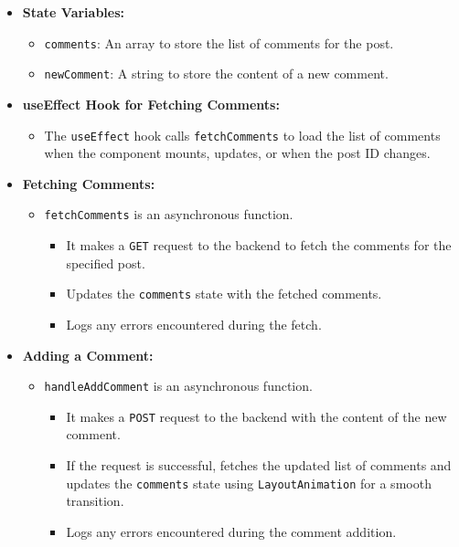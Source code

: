 \begin{itemize}
    \item \textbf{State Variables:}
    \begin{itemize}
        \item \texttt{comments}: An array to store the list of comments for the post.
        \item \texttt{newComment}: A string to store the content of a new comment.
    \end{itemize}

    \item \textbf{useEffect Hook for Fetching Comments:}
    \begin{itemize}
        \item The \texttt{useEffect} hook calls \texttt{fetchComments} to load the list of comments when the component mounts, updates, or when the post ID changes.
    \end{itemize}

    \item \textbf{Fetching Comments:}
    \begin{itemize}
        \item \texttt{fetchComments} is an asynchronous function.
        \begin{itemize}
            \item It makes a \texttt{GET} request to the backend to fetch the comments for the specified post.
            \item Updates the \texttt{comments} state with the fetched comments.
            \item Logs any errors encountered during the fetch.
        \end{itemize}
    \end{itemize}

    \item \textbf{Adding a Comment:}
    \begin{itemize}
        \item \texttt{handleAddComment} is an asynchronous function.
        \begin{itemize}
            \item It makes a \texttt{POST} request to the backend with the content of the new comment.
            \item If the request is successful, fetches the updated list of comments and updates the \texttt{comments} state using \texttt{LayoutAnimation} for a smooth transition.
            \item Logs any errors encountered during the comment addition.
        \end{itemize}
    \end{itemize}


\end{itemize}
